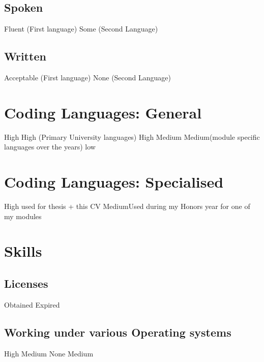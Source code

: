 \documentclass[12pt,a4paper,sans]{moderncv}        %
\begin{document}
\subsection{Spoken}
		{Fluent}	 	{(First language)}
	{Some}	 		{(Second Language)}

\subsection{Written}
		{Acceptable}	{(First language)}
	{None}	 		{(Second Language)}

\section{Coding Languages: General}
		{High}	{}
		{High}	{(Primary University languages)}
		{High}	{}
			{Medium}{}
			{Medium}{(module specific languages over the years)}
		{low}{}

\section{Coding Languages: Specialised}
		{High}	{used for thesis + this CV}
	{Medium}{Used during my Honors year for one of my modules}

\pagebreak

\section{Skills}
\subsection{Licenses}
							{Obtained}		{}
	{Expired}		{}

\subsection{Working under various Operating systems}
			{High}		{}
			{Medium}	{}
				{None}		{}
	{Medium}	{}
	{}
\end{document}
